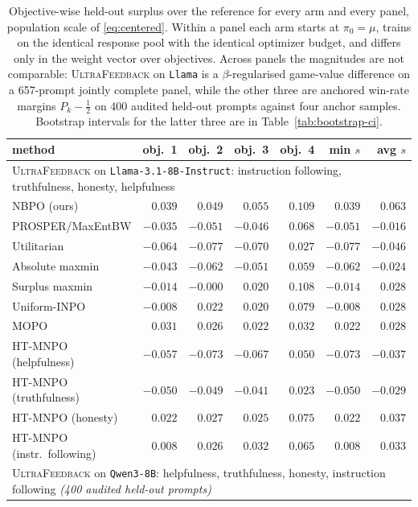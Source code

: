 \documentclass{article}
\theoremstyle{remark}
\theoremstyle{plain}
\newcommand{\NBPO}{\textsc{NBPO}}
\begin{document}
\begin{table}[t]
\centering\scriptsize
\setlength{\tabcolsep}{3.2pt}
\caption{Objective-wise held-out surplus over the reference for every arm and every panel, population
scale of \eqref{eq:centered}. Within a panel each arm starts at $\pi_0=\mu$, trains on the identical
response pool with the identical optimizer budget, and differs only in the weight vector over objectives.
Across panels the magnitudes are not comparable: \textsc{UltraFeedback} on \texttt{Llama} is a $\beta$-regularised game-value difference on a 657-prompt jointly complete panel, while the other three are anchored win-rate margins $P_k-\tfrac12$ on 400 audited held-out prompts against four anchor samples. Bootstrap intervals for the latter three are in Table~\ref{tab:bootstrap-ci}.}
\label{tab:objectivewise-appendix}
\begin{tabular}{lrrrrrr}
\toprule
method & obj.\ 1 & obj.\ 2 & obj.\ 3 & obj.\ 4 & min $s$ & avg $s$\\
\midrule
\multicolumn{7}{l}{\textsc{UltraFeedback} on \texttt{Llama-3.1-8B-Instruct}: instruction following, truthfulness, honesty, helpfulness}\\
\NBPO{} (ours) & $0.039$ & $0.049$ & $0.055$ & $0.109$ & $0.039$ & $0.063$\\
PROSPER/MaxEntBW & $-0.035$ & $-0.051$ & $-0.046$ & $0.068$ & $-0.051$ & $-0.016$\\
Utilitarian & $-0.064$ & $-0.077$ & $-0.070$ & $0.027$ & $-0.077$ & $-0.046$\\
Absolute maxmin & $-0.043$ & $-0.062$ & $-0.051$ & $0.059$ & $-0.062$ & $-0.024$\\
Surplus maxmin & $-0.014$ & $-0.000$ & $0.020$ & $0.108$ & $-0.014$ & $0.028$\\
Uniform-INPO & $-0.008$ & $0.022$ & $0.020$ & $0.079$ & $-0.008$ & $0.028$\\
MOPO & $0.031$ & $0.026$ & $0.022$ & $0.032$ & $0.022$ & $0.028$\\
HT-MNPO (helpfulness) & $-0.057$ & $-0.073$ & $-0.067$ & $0.050$ & $-0.073$ & $-0.037$\\
HT-MNPO (truthfulness) & $-0.050$ & $-0.049$ & $-0.041$ & $0.023$ & $-0.050$ & $-0.029$\\
HT-MNPO (honesty) & $0.022$ & $0.027$ & $0.025$ & $0.075$ & $0.022$ & $0.037$\\
HT-MNPO (instr.\ following) & $0.008$ & $0.026$ & $0.032$ & $0.065$ & $0.008$ & $0.033$\\
\midrule
\multicolumn{7}{l}{\textsc{UltraFeedback} on \texttt{Qwen3-8B}: helpfulness, truthfulness, honesty, instruction following \emph{(400 audited held-out prompts)}}\\

\end{tabular}
\end{table}
\end{document}
